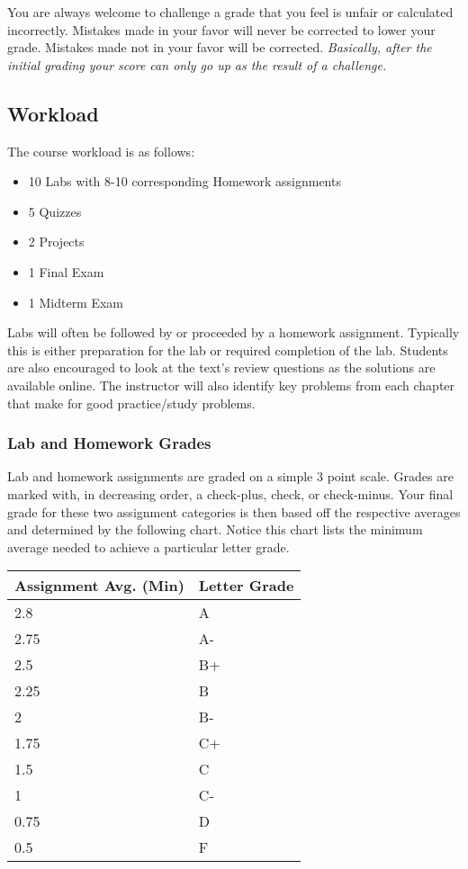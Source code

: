 \documentclass[10pt]{article}
\begin{document}
You are always welcome to challenge a grade that you feel is unfair or calculated incorrectly.  Mistakes made in your favor will never be corrected to lower your grade.  Mistakes made not in your favor will be corrected.  \textit{Basically, after the initial grading your score can only go up as the result of a challenge.}

\subsection{Workload}

The course workload is as follows:
\begin{itemize}
\item 10 Labs with 8-10 corresponding Homework assignments
\item 5 Quizzes
\item 2 Projects
\item 1 Final Exam
\item 1 Midterm Exam
\end{itemize}

Labs will often be followed by or proceeded by a homework assignment.  Typically this is either preparation for the lab or required completion of the lab. Students are also encouraged to look at the text's review questions as the solutions are available online.  The instructor will also identify key problems from each chapter that make for good practice/study problems. 

\subsubsection{Lab and Homework Grades}

Lab and homework assignments are graded on a simple 3 point scale. Grades are marked with, in decreasing order, a check-plus, check, or check-minus. Your final grade for these two assignment categories is then based off the respective averages and determined by the following chart.  Notice this chart lists the minimum average needed to achieve a particular letter grade.  

\begin{center}
\begin{small}
\begin{tabular}{ll}
Assignment Avg. (Min) & Letter Grade \\ \hline
2.8   & A  \\
2.75    & A- \\
2.5 & B+ \\
2.25    & B  \\ 
2   & B- \\
1.75    & C+ \\
1.5 & C  \\
1   & C- \\
0.75    & D  \\
0.5  & F 
\end{tabular}
\end{small}
\end{center}
\end{document}
